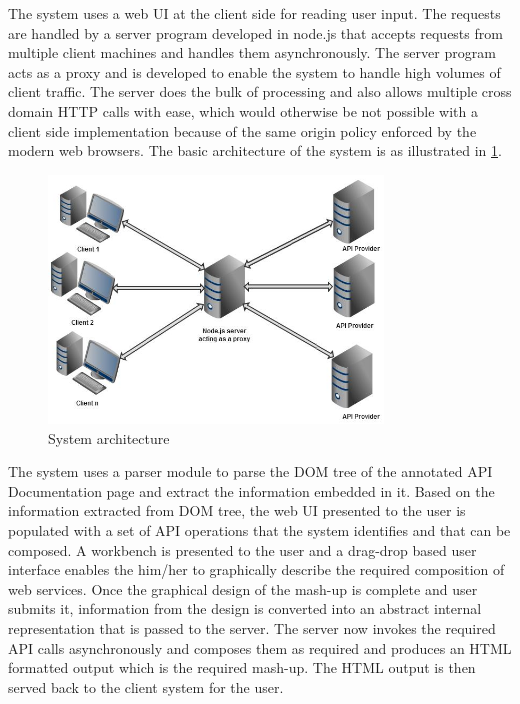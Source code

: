 \documentclass[journal]{IEEEtran}
\begin{document}
The system uses a web UI at the client side for reading user input. The requests are handled by a server program developed in node.js that accepts requests from multiple client machines and handles them asynchronously. The server program acts as a proxy and is developed to enable the system to handle high volumes of client traffic. The server does the bulk of processing and also allows multiple cross domain HTTP calls with ease, which would otherwise be not possible with a client side implementation because of the same origin policy enforced by the modern web browsers.
The basic architecture of the system is as illustrated in \ref{fig:sys_arch}.
\begin{figure}[!t]
    \centering
    \includegraphics[width=3.5in]{images/sys_arch.png}
    \caption{System architecture}
    \label{fig:sys_arch}
\end{figure}

The system uses a parser module to parse the DOM tree of the annotated API Documentation page and extract the information embedded in it. Based on the information extracted from DOM tree, the web UI presented to the user is populated with a set of API operations that the system identifies and that can be composed. A workbench is presented to the user and a drag-drop based user interface enables the him/her to graphically describe the required composition of web services. Once the graphical design of the mash-up is complete and user submits it, information from the design is converted into an abstract internal representation that is passed to the server. The server now invokes the required API calls asynchronously and composes them as required and produces an HTML formatted output which is the required mash-up. The HTML output is then served back to the client system for the user.
\end{document}
